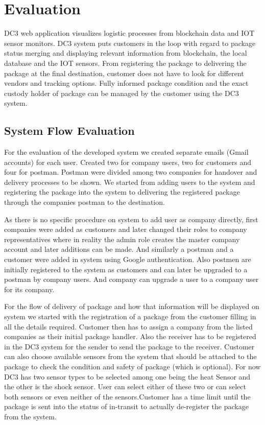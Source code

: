 \chapter{Evaluation}
\label{cha:evaluation}

DC3 web application visualizes logistic processes from blockchain data and IOT sensor monitors. DC3 system puts customers in the loop with regard to package status merging and displaying relevant information from blockchain, the local database and the IOT sensors. From registering the package to delivering the package at the final destination, customer does not have to look for different vendors and tracking options. Fully informed package condition and the exact custody holder of package can be managed by the customer using the DC3 system.
\section{System Flow Evaluation}
For the evaluation of the developed system we created separate emails (Gmail accounts) for each user. Created two for company users, two for customers and four for postman. Postman were divided among two companies for handover and delivery processes to be shown. We started from adding users to the system and registering the package into the system to delivering the registered package through the companies postman to the destination.

As there is no specific procedure on system to add user as company directly, first companies were added as customers and later changed their roles to company representatives where in reality the admin role creates the master company account and later additions can be made. And similarly a postman and a customer were added in system using Google authentication. Also postmen are initially registered to the system as customers and can later be upgraded to a postman by company users. And company can upgrade a user to a company user for its company.

For the flow of delivery of package and how that information will be displayed on system we started with the registration of a package from the customer filling in all the details required. Customer then has to assign a company from the listed companies as their initial package handler. Also the receiver has to be registered in the DC3 system for the sender to send the package to the receiver. Customer can also choose available sensors from the system that should be attached to the package to check the condition and safety of package (which is optional). For now DC3 has two sensor types to be selected among one being the heat Sensor and the other is the shock sensor. User can select either of these two or can select both sensors or even neither of the sensors.Customer has a time limit until the package is sent into the status of in-transit to actually de-register the package from the system.

